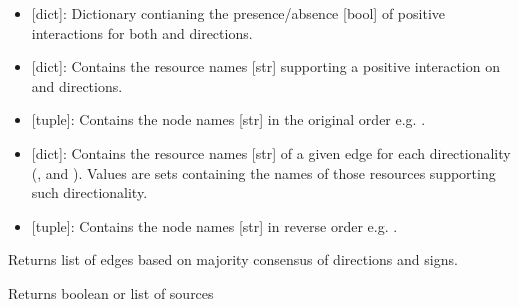 \documentclass[letterpaper,10pt,english]{sphinxmanual}
\begin{document}
\begin{fulllineitems}
\begin{itemize}
\begin{description}
\begin{itemize}
\item {} 
 {[}dict{]}:  Dictionary contianing the presence/absence
{[}bool{]} of positive interactions for both  and
 directions.

\item {} 
 {[}dict{]}: Contains the resource names {[}str{]}
supporting a positive interaction on  and
 directions.

\item {} 
 {[}tuple{]}: Contains the node names {[}str{]} in the original
order e.g. .

\item {} 
 {[}dict{]}: Contains the resource names {[}str{]} of a given
edge for each directionality (,  and
). Values are sets containing the names of
those resources supporting such directionality.

\item {} 
 {[}tuple{]}: Contains the node names {[}str{]} in reverse
order e.g. .

\end{itemize}

\end{description}

\end{itemize}

\begin{fulllineitems}
\label{\detokenize{main:pypath.main.Direction.consensus_edges}}
Returns list of edges based on majority consensus of directions and signs.

\end{fulllineitems}


\begin{fulllineitems}
\label{\detokenize{main:pypath.main.Direction.get_dir}}
Returns boolean or list of sources


\end{fulllineitems}
\end{fulllineitems}
\end{document}
